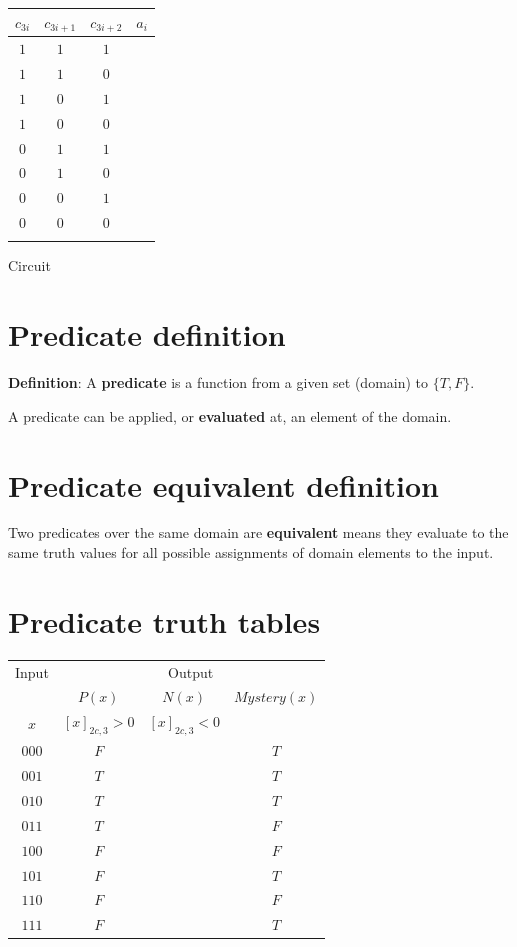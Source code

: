 \documentclass[12pt, oneside]{article}
\begin{document}
\begin{center}
\begin{multicols}{2}\begin{tabular}{ccc|c}
$c_{3i}$ & $c_{3i+1}$ & $c_{3i+2}$ & $a_i$ \\
\hline
$1$ & $1$ & $1$ & $\phantom{1}$ \\
$1$ & $1$ & $0$ & $\phantom{1}$ \\
$1$ & $0$ & $1$ & $\phantom{1}$ \\
$1$ & $0$ & $0$ & $\phantom{0}$ \\
$0$ & $1$ & $1$ & $\phantom{1}$ \\
$0$ & $1$ & $0$ & $\phantom{0}$ \\
$0$ & $0$ & $1$ & $\phantom{0}$ \\
$0$ & $0$ & $0$ & $\phantom{0}$ \\\\
\end{tabular}
\columnbreak

Circuit 
\end{multicols}
\end{center} \vfill
\section*{Predicate definition}


{\bf  Definition}: A  {\bf predicate}  is  a function from a given set (domain) to $\{T,F\}$.

A predicate can be applied, or {\bf evaluated} at, an element of the domain. \vfill
\section*{Predicate equivalent definition}


Two predicates over the same domain are {\bf equivalent} means they evaluate to
the same truth values for all possible assignments of domain elements to the
input. \vfill
\section*{Predicate truth tables}


\begin{center}
    \begin{tabular}{c||c|c|c}
    Input & \multicolumn{3}{c}{Output} \\
    &$P(x)$ & $N(x)$ & $Mystery(x)$\\
    $x$ & $[x]_{2c,3} > 0$ & $[x]_{2c,3} < 0$& \\
    \hline
    $000$  & $F$ & & $T$\\
    $001$  & $T$ & & $T$\\
    $010$  & $T$ & & $T$\\
    $011$  & $T$ & & $F$\\
    $100$  & $F$ & & $F$\\
    $101$  & $F$ & & $T$\\
    $110$  & $F$ & & $F$\\
    $111$  & $F$ & & $T$\\
    \end{tabular}
    \end{center}
    
\end{document}

